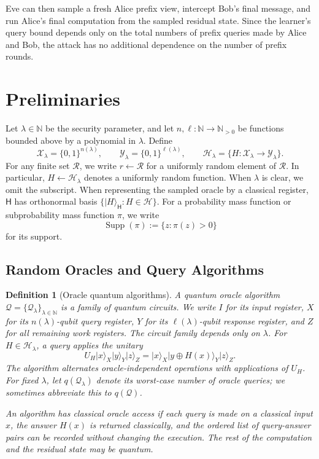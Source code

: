 \documentclass[11pt]{article}
\newcounter{algorithm}
\newtheorem{definition}[definition]{Definition}
\newcommand{\bits}{\{0,1\}}
\newcommand{\cH}{\mathcal{H}}
\newcommand{\cR}{\mathcal{R}}
\newcommand{\cX}{\mathcal{X}}
\newcommand{\cY}{\mathcal{Y}}
\newcommand{\Supp}{\operatorname{Supp}}
\newcommand{\ket}[1]{\lvert #1\rangle}
\begin{document}
Eve can then sample a fresh Alice prefix view, intercept Bob's final message,
and run Alice's final computation from the sampled residual state.  Since
the learner's query bound depends only on the total numbers of prefix
queries made by Alice and Bob, the attack has no additional dependence on
the number of prefix rounds.


\section{Preliminaries}\label{sec:preliminaries}

Let \(\lambda\in\mathbb{N}\) be the security parameter, and let
\(n,\ell:\mathbb{N}\to\mathbb{N}_{>0}\) be functions bounded above by a
polynomial in \(\lambda\). Define
\[
  \cX_\lambda=\bits^{n(\lambda)},
  \qquad
  \cY_\lambda=\bits^{\ell(\lambda)},
  \qquad
  \cH_\lambda=\{H:\cX_\lambda\to\cY_\lambda\}.
\]
For any finite set \(\cR\), we write \(r\leftarrow\cR\) for a uniformly
random element of \(\cR\).  In particular,
\(H\leftarrow\cH_\lambda\) denotes a uniformly random function.  When
\(\lambda\) is clear, we omit the subscript.  When representing the
sampled oracle by a classical register, \(\mathsf H\) has orthonormal basis
\(\{\ket{H}_{\mathsf H}:H\in\cH\}\). For a probability mass function or subprobability mass function \(\pi\), we
write
\[
  \Supp(\pi):=\{z:\pi(z)>0\}
\]
for its support.

\subsection{Random Oracles and Query Algorithms}

\begin{definition}[Oracle quantum algorithms]\label{def:oracle-algorithms}
A quantum oracle algorithm
\(\mathcal Q=\{\mathcal Q_\lambda\}_{\lambda\in\mathbb N}\) is a family
of quantum circuits. We write \(I\) for its input register, \(X\) for its
\(n(\lambda)\)-qubit query register, \(Y\) for its
\(\ell(\lambda)\)-qubit response register, and \(Z\) for all remaining work
registers. The circuit family depends only on $\lambda$. For
\(H\in\cH_\lambda\), a query applies the unitary
\[
  U_H\ket{x}_X\ket{y}_Y\ket{z}_Z
  =
  \ket{x}_X\ket{y\oplus H(x)}_Y\ket{z}_Z.
\]
The algorithm alternates oracle-independent operations with applications of
\(U_H\). For fixed \(\lambda\), let \(q(\mathcal Q_\lambda)\) denote its
worst-case number of oracle queries; we sometimes abbreviate this to
\(q(\mathcal Q)\). 

An algorithm has \emph{classical oracle access} if each query is made on a
classical input \(x\), the answer \(H(x)\) is returned classically, and the
ordered list of query-answer pairs can be recorded without changing the
execution. The rest of the computation and the residual state may be
quantum.
\end{definition}
\end{document}
